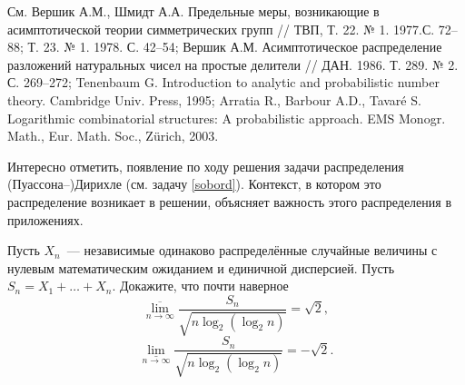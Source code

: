 \begin{remark} См. Вершик А.М., Шмидт А.А. Предельные меры, возникающие 
в асимптотической теории симметрических групп // ТВП, Т. 22. № 1. 1977.С. 
72--88; Т. 23. № 1. 1978. С. 42--54; Вершик А.М. Асимптотическое 
распределение разложений натуральных чисел на простые делители // ДАН. 1986. 
Т. 289. № 2. С. 269--272; Tenenbaum G. Introduction to analytic and 
probabilistic number theory. Cambridge Univ. Press, 1995; Arratia R., 
Barbour A.D., Tavar\'{e} S. Logarithmic combinatorial structures: A 
probabilistic approach. EMS Monogr. Math., Eur. Math. Soc., Z\"{u}rich, 
2003.

Интересно отметить, появление по ходу решения задачи распределения 
(Пуассона--)Дирихле (см. задачу \ref{sobord}). Контекст, в котором это распределение возникает в 
решении, объясняет важность этого распределения в приложениях.
\end{remark}

\begin{problem}
Пусть $X_n$~--- независимые одинаково распределённые случайные величины с нулевым математическим ожиданием и единичной дисперсией. Пусть $S_n = X_1+\ldots+ X_n$. Докажите, что почти наверное
\[\underset{n \rightarrow \infty}{\overline{\lim} } \frac{S_n}{\sqrt{n \log_2 (\log_2 n)}} = \sqrt{2},\]
\[\underset{n \rightarrow \infty}{\underline{\lim} } \frac{S_n}{\sqrt{n \log_2 (\log_2 n)}} = -\sqrt{2}.\]
\end{problem}

